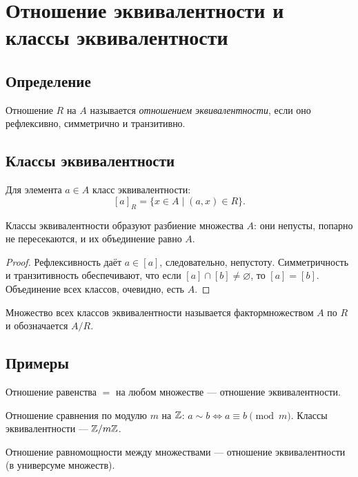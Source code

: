 \documentclass[10pt]{article}
\begin{document}
\section{Отношение эквивалентности и классы эквивалентности}
\subsection{Определение}
\begin{definition}
Отношение $R$ на $A$ называется \emph{отношением эквивалентности}, если оно рефлексивно, симметрично и транзитивно.
\end{definition}

\subsection{Классы эквивалентности}
\begin{definition}
Для элемента $a \in A$ класс эквивалентности:
$$ [a]_R = \{ x \in A \mid (a,x) \in R \}. $$
\end{definition}

\begin{theorem}
Классы эквивалентности образуют разбиение множества $A$: они непусты, попарно не пересекаются, и их объединение равно $A$.
\end{theorem}
\begin{proof}
Рефлексивность даёт $a \in [a]$, следовательно, непустоту. Симметричность и транзитивность обеспечивают, что если $[a] \cap [b] \ne \varnothing$, то $[a] = [b]$. Объединение всех классов, очевидно, есть $A$.
\end{proof}

\begin{definition}[Фактормножество]
Множество всех классов эквивалентности называется фактормножеством $A$ по $R$ и обозначается $A / R$.
\end{definition}

\subsection{Примеры}
\begin{example}
Отношение равенства $=$ на любом множестве — отношение эквивалентности.
\end{example}
\begin{example}
Отношение сравнения по модулю $m$ на $\mathbb{Z}$: $a \sim b \iff a \equiv b \pmod{m}$. Классы эквивалентности — $\mathbb{Z}/m\mathbb{Z}$.
\end{example}
\begin{example}
Отношение равномощности между множествами — отношение эквивалентности (в универсуме множеств).
\end{example}
\end{document}
